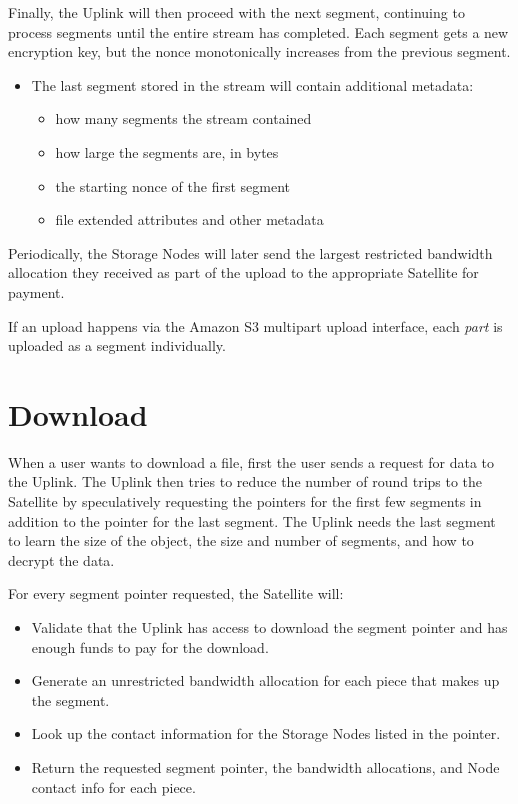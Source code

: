 \documentclass[8pt,fleqn,openany]{book}
\begin{document}
Finally, the Uplink will then proceed with the next segment, continuing to
process segments until the entire stream has completed. Each segment gets
a new encryption key, but the nonce monotonically increases from the previous
segment.

\begin{itemize}
\item The last segment stored in the stream will contain additional metadata:
  \begin{itemize}
  \item how many segments the stream contained
  \item how large the segments are, in bytes
  \item the starting nonce of the first segment
  \item file extended attributes and other metadata
  \end{itemize}
\end{itemize}

Periodically, the Storage Nodes will later send the largest restricted
bandwidth allocation they received as part of the upload to the appropriate
Satellite for payment.

If an upload happens via the Amazon S3 multipart upload interface, each
{\em part} is uploaded as a segment individually.

\section{Download}

When a user wants to download a file, first the user sends a request for
data to the Uplink.
  The Uplink then tries to reduce the number of round trips to the Satellite
  by speculatively requesting the pointers for the first few segments in
  addition to the pointer for the last segment. The Uplink needs the last
  segment to learn the size of the object, the size and number of segments,
  and how to decrypt the data.

For every segment pointer requested, the Satellite will:
  \begin{itemize}
  \item Validate that the Uplink has access to download the segment pointer
    and has enough funds to pay for the download.
  \item Generate an unrestricted bandwidth allocation for each piece that
    makes up the segment.
  \item Look up the contact information for the Storage Nodes listed in the
  pointer.
  \item Return the requested segment pointer, the bandwidth allocations, and
    Node contact info for each piece.
  \end{itemize}
\end{document}

